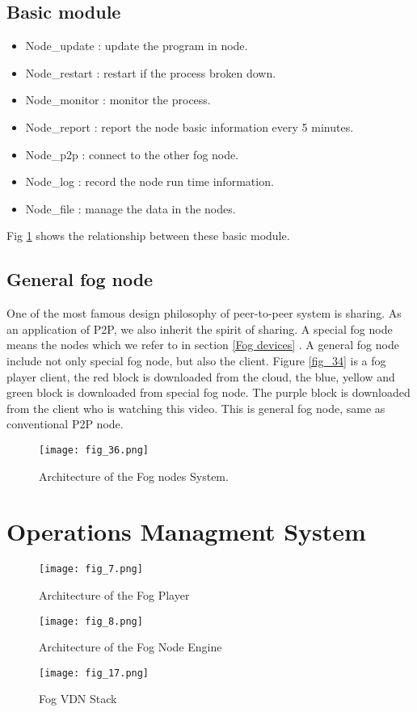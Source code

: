  \subsection{Basic module}

  \begin{itemize}
    \item Node\_update  : update the program in node.
    \item Node\_restart : restart if the process broken down.
    \item Node\_monitor : monitor the process.
    \item Node\_report  : report the node basic information every 5 minutes.
    \item Node\_p2p     : connect to the other fog node.
    \item Node\_log     : record the node run time information.
    \item Node\_file    : manage the data in the nodes.
  \end{itemize}

  Fig \ref{fig_36} shows the relationship between these basic module.
 \subsection{General fog node}
 One of the most famous design philosophy of peer-to-peer system is sharing. As an application of P2P,
we also inherit the spirit of sharing. A special fog node  means the nodes which we refer to in section
\ref{Fog devices} . A general fog node include not only special fog node, but also the client. Figure
\ref{fig_34} is a fog player client, the red block is downloaded from the cloud, the blue, yellow and green
block is downloaded from special fog node. The purple block is downloaded from the client who is watching
this video. This is general fog node, same as conventional P2P node.

\begin{figure}[htbp]
\centering
	  \texttt{[image: fig\_36.png]}
    \caption{ Architecture of the Fog nodes System.}
 \label{fig_36}
\end{figure}

\section{Operations Managment System}



\begin{figure}[htbp]
\centering
	  \texttt{[image: fig\_7.png]}
    \caption{Architecture of the Fog Player}
	  \vskip 1.0cm
 \label{fig_7}
\end{figure}

\begin{figure}[htbp]
\centering
	  \texttt{[image: fig\_8.png]}
    \caption{Architecture of the Fog Node Engine}
 \label{fig_8}
\end{figure}

\begin{figure}[htbp]
\centering
	  \texttt{[image: fig\_17.png]}
    \caption{Fog VDN Stack}
 \label{fig_17}
\end{figure}
